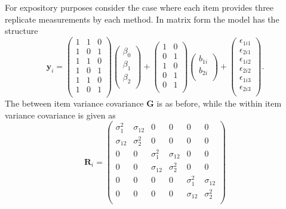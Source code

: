 \documentclass[12pt, a4paper]{report}
\theoremstyle{plain}
\theoremstyle{definition}
\theoremstyle{remark}
\begin{document}
		For expository purposes consider the case where each item provides three replicate measurements by each method. In matrix form the model has the structure
		\[
		\boldsymbol{y}_{i} =
		\left(\begin{array}{ccc}
		1 & 1 & 0 \\ 1 & 0 & 1 \\ 1 & 1 & 0 \\
		1 & 0 & 1 \\ 1 & 1 & 0 \\ 1 & 0 & 1 \\
		\end{array}\right)
		\left(\begin{array}{c}
		\beta_0 \\ \beta_1 \\ \beta_2 \\
		\end{array}\right)
		+
		\left(\begin{array}{cc}
		1 & 0 \\0 & 1 \\1 & 0 \\0 & 1 \\0 & 1 \\\end{array}
		\right)
		\left(\begin{array}{c}
		b_{1i} \\   b_{2i} \\
		\end{array}\right)
		+
		\left( \begin{array}{c}
		\epsilon_{1i1} \\\epsilon_{2i1} \\\epsilon_{1i2} \\ \epsilon_{2i2} \\\epsilon_{1i3} \\\epsilon_{2i3} \\
		\end{array}\right).
		\]
		The between item variance covariance $\boldsymbol{G}$ is as before, while the within item variance covariance is given as
		\[
		\boldsymbol{R}_i = \left(
		\begin{array}{cccccc}
		\sigma^2_{1} & \sigma_{12} & 0 & 0 & 0 & 0 \\
		\sigma_{12} & \sigma^2_{2} & 0 & 0 & 0 & 0 \\
		0 & 0 & \sigma^2_{1} & \sigma_{12} & 0 & 0 \\
		0 & 0 & \sigma_{12} & \sigma^2_{2} & 0 & 0 \\
		0 & 0 & 0 & 0 & \sigma^2_{1} & \sigma_{12} \\
		0 & 0 & 0 & 0 & \sigma_{12} & \sigma^2_{2} \\
		\end{array} \right)
		\]
	
\end{document}
